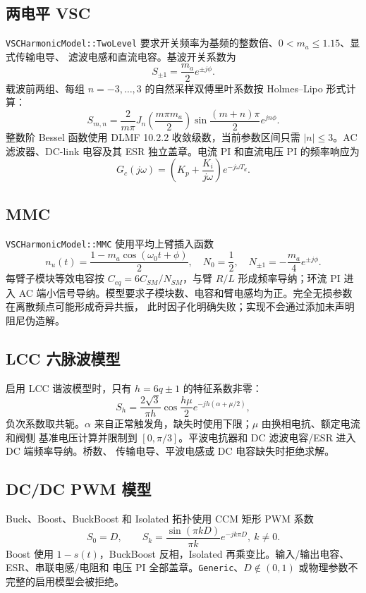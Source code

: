 \subsection{两电平 VSC}
\texttt{VSCHarmonicModel::TwoLevel} 要求开关频率为基频的整数倍、$0<m_a\le1.15$、显式传输电导、
滤波电感和直流电容。基波开关系数为
\begin{equation}
 S_{\pm1}=\frac{m_a}{2}e^{\pm j\phi}.
\end{equation}
载波前两组、每组 $n=-3,\ldots,3$ 的自然采样双傅里叶系数按 Holmes--Lipo 形式计算：
\begin{equation}
 S_{m,n}=\frac{2}{m\pi}J_n\!\left(\frac{m\pi m_a}{2}\right)
 \sin\frac{(m+n)\pi}{2}e^{jn\phi}.
\end{equation}
整数阶 Bessel 函数使用 DLMF 10.2.2 收敛级数，当前参数区间只需 $|n|\le3$。AC 滤波器、DC-link
电容及其 ESR 独立盖章。电流 PI 和直流电压 PI 的频率响应为
\begin{equation}
 G_c(j\omega)=\left(K_p+\frac{K_i}{j\omega}\right)e^{-j\omega T_d}.
\end{equation}

\subsection{MMC}
\texttt{VSCHarmonicModel::MMC} 使用平均上臂插入函数
\begin{equation}
 n_u(t)=\frac{1-m_a\cos(\omega_0t+\phi)}{2},\quad
 N_0=\frac{1}{2},\quad N_{\pm1}=-\frac{m_a}{4}e^{\pm j\phi}.
\end{equation}
每臂子模块等效电容按 $C_{eq}=6C_{SM}/N_{SM}$，与臂 $R/L$ 形成频率导纳；环流 PI 进入 AC
端小信号导纳。模型要求子模块数、电容和臂电感均为正。完全无损参数在离散频点可能形成奇异共振，
此时因子化明确失败；实现不会通过添加未声明阻尼伪造解。

\subsection{LCC 六脉波模型}
启用 LCC 谐波模型时，只有 $h=6q\pm1$ 的特征系数非零：
\begin{equation}
 S_h=\frac{2\sqrt3}{\pi h}\cos\frac{h\mu}{2}
 e^{-jh(\alpha+\mu/2)},
\end{equation}
负次系数取共轭。$\alpha$ 来自正常触发角，缺失时使用下限；$\mu$ 由换相电抗、额定电流和阀侧
基准电压计算并限制到 $[0,\pi/3]$。平波电抗器和 DC 滤波电容/ESR 进入 DC 端频率导纳。桥数、
传输电导、平波电感或 DC 电容缺失时拒绝求解。

\subsection{DC/DC PWM 模型}
Buck、Boost、BuckBoost 和 Isolated 拓扑使用 CCM 矩形 PWM 系数
\begin{equation}
 S_0=D,\qquad S_k=\frac{\sin(\pi kD)}{\pi k}e^{-jk\pi D},\ k\ne0.
\end{equation}
Boost 使用 $1-s(t)$，BuckBoost 反相，Isolated 再乘变比。输入/输出电容、ESR、串联电感/电阻和
电压 PI 全部盖章。\texttt{Generic}、$D\notin(0,1)$ 或物理参数不完整的启用模型会被拒绝。

